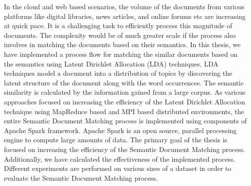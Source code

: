 
In the cloud and web based scenarios, the volume of the documents from various platforms like digital libraries, news articles, and online forums etc are increasing at quick pace. It is a challenging task to efficiently process this magnitude of documents. The complexity would be of much greater scale if the process also involves in matching the documents based on their semantics. In this thesis, we have implemented a process flow for matching the similar documents based on the semantics using Latent Dirichlet Allocation (LDA) techniques. LDA techniques model a document into a distribution of topics by discovering the latent structure of the document along with the word occurrences. The semantic similarity is calculated by the information gained from a large corpus. As various approaches focused on increasing the efficiency of the Latent Dirichlet Allocation technique using MapReduce based and MPI based distributed environments, the entire Semantic Document Matching process is implemented using components of Apache Spark framework. Apache Spark is an open source, parallel processing engine to compute large amounts of data. The primary goal of the thesis is focused on increasing the efficiency of the Semantic Document Matching process. Additionally, we have calculated the effectiveness of the implemented process. Different experiments are performed on various sizes of a dataset in order to evaluate the Semantic Document Matching process.
